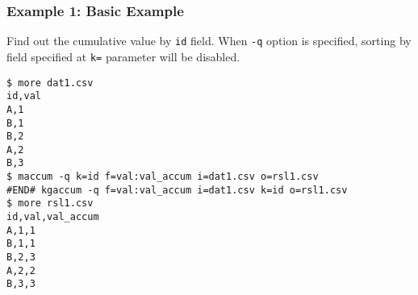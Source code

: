 \subsubsection*{Example 1: Basic Example }

Find out the cumulative value by \verb|id| field. When \verb|-q| option is specified, sorting by field specified at \verb|k=| parameter will be disabled.


\begin{Verbatim}[baselinestretch=0.7,frame=single]
$ more dat1.csv
id,val
A,1
B,1
B,2
A,2
B,3
$ maccum -q k=id f=val:val_accum i=dat1.csv o=rsl1.csv
#END# kgaccum -q f=val:val_accum i=dat1.csv k=id o=rsl1.csv
$ more rsl1.csv
id,val,val_accum
A,1,1
B,1,1
B,2,3
A,2,2
B,3,3
\end{Verbatim}
